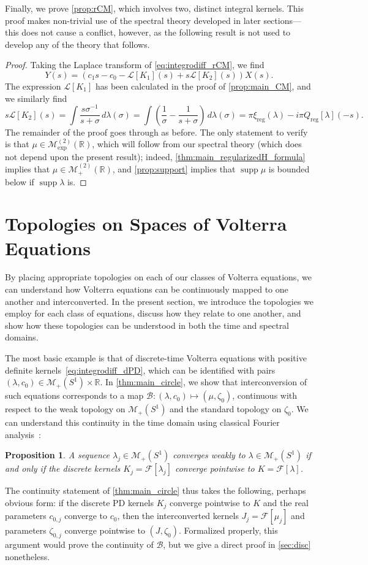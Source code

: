 \documentclass{cams-l} %
\newcommand{\dave}[1]{#1}\newcommand{\davebegin}{}\newcommand{\daveend}{}\newcommand{\george}[1]{#1}
\newcommand{\RR}{\mathbb R}
\newcommand{\cL}{\mathcal L}
\newcommand{\cM}{\mathcal M}
\newcommand{\cB}{\mathcal B}
\newcommand{\cF}{\mathcal F}
\newcommand{\supp}{\operatorname{supp}}
\newtheorem{proposition}[theorem]{Proposition}
\theoremstyle{definition}
\theoremstyle{remark}
\numberwithin{equation}{section}
\begin{document}
Finally, we prove \cref{prop:rCM}, which involves two, distinct integral kernels. This proof makes non-trivial use of the spectral theory developed in later sections---this does not cause a conflict, however, as the following result is not used to develop any of the theory that follows.
\propmainrCM*
\begin{proof}
Taking the Laplace transform of \ref{eq:integrodiff_rCM}, we find
\[Y(s) = \left(c_1s - c_0 - \cL[K_1](s) + s\cL[K_2](s)\right)X(s).\]
The expression $\cL[K_1]$ has been calculated in the proof of \cref{prop:main_CM}, and we similarly find
\[s\cL[K_2](s) = \int\frac{s\sigma^{-1}}{s+\sigma}\,d\lambda(\sigma) = \int \left(\frac{1}{\sigma} - \frac{1}{s+\sigma}\right)\,d\lambda(\sigma) = \pi\xi_\mathrm{reg}(\lambda) - i \pi Q_\mathrm{reg}[\lambda](-s).\]
The remainder of the proof goes through as before. The only statement to verify is that $\mu\in\cM_\mathrm{exp}^{(2)}(\RR)$, which will follow from our spectral theory (which does not depend upon the present result); indeed, \cref{thm:main_regularizedH_formula} implies that $\mu\in\cM_+^{(2)}(\RR)$, and \cref{prop:support} implies that $\supp\mu$ is bounded below if $\supp\lambda$ is.
\end{proof}
\section{Topologies on Spaces of Volterra Equations}\label{sec:topologies}
By placing appropriate topologies on \dave{each of our classes of Volterra equations}, we can understand how Volterra equations can be continuously mapped to one another and interconverted. In the present section, we introduce the topologies we employ for each class of equations, discuss how they relate to one another, and show how these topologies can be understood in both the time and spectral domains.

The most basic example is that of discrete-time Volterra equations with positive definite kernels~\ref{eq:integrodiff_dPD}, \dave{which} can be identified with pairs $(\lambda,c_0)\in\cM_+(S^1)\times\RR$. In \cref{thm:main_circle}, we show that interconversion of such equations corresponds to a map $\cB:(\lambda,c_0)\mapsto (\mu,\zeta_0)$, continuous with respect to the weak topology on $\cM_+(S^1)$ and the standard topology on $\zeta_0$. \dave{We can understand this continuity in the time domain using classical Fourier analysis}~\cite[Sec.~26]{billingsley2017probability}:
\begin{proposition}\label{prop:time_cont_circ}
    A sequence $\lambda_j\in\cM_+(S^1)$ converges weakly to $\lambda\in\cM_+(S^1)$ if and only if the discrete kernels $K_j = \cF[\lambda_j]$ converge pointwise to $K=\cF[\lambda]$.
\end{proposition}
The continuity statement of \cref{thm:main_circle} thus takes the following, perhaps obvious form: if the discrete PD kernels $K_j$ converge pointwise to $K$ and the real parameters $c_{0,j}$ converge to $c_0$, then the interconverted kernels $J_j = \cF[\mu_j]$ and parameters $\zeta_{0,j}$ converge pointwise to $(J,\zeta_0)$. \dave{Formalized properly, this argument would prove the continuity of $\cB$, but we give a direct proof in \cref{sec:disc} nonetheless.}
\end{document}

